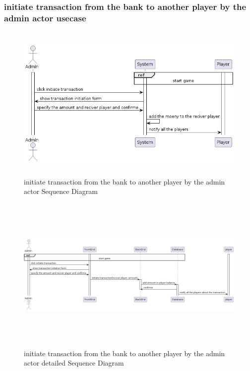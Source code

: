 \documentclass{article}
\begin{document}
\subsubsection{initiate transaction from the bank to another player by the admin actor usecase}
 \begin{figure}[H]
	 \centering
	 \includegraphics[height=3in]{../thesis_tex/assets/diagrams/initiate_transaction_to_another_player_SD.png}
	 \caption{initiate transaction from the bank to another player by the admin actor Sequence Diagram}
\end{figure}

 \begin{figure}[H]
	 \centering
	 \includegraphics[height=3in,width=6in]{../thesis_tex/assets/diagrams/initiate_transaction_to_another_player_detailedSD.png}
	 \caption{initiate transaction from the bank to another player by the admin actor detailed Sequence Diagram}
\end{figure}
\end{document}

